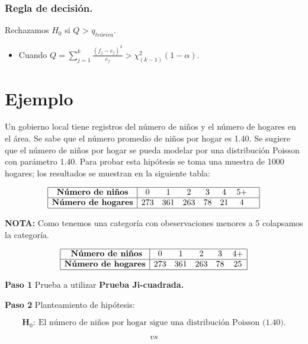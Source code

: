 \documentclass[
  a4paper,
  oneside,
  openany]{book}
\providecommand{\tightlist}{%
  \setlength{\itemsep}{0pt}\setlength{\parskip}{0pt}}
\begin{document}
\hypertarget{regla-de-decisiuxf3n.}{%
\subsubsection*{Regla de decisión.}\label{regla-de-decisiuxf3n.}}


Rechazamos \(H_0\) si \(Q\) \textgreater{} \(q_{teórica}.\)

\begin{itemize}
\tightlist
\item
  Cuando \(Q= \sum_{j=1}^{k}\frac{(f_{j}-e_{j})^2}{e_{j}} > \chi^2_{(k-1)}(1-\alpha).\)
\end{itemize}

\hypertarget{ejemplo-11}{%
\section{Ejemplo}\label{ejemplo-11}}

Un gobierno local tiene registros del número de niños y el número de hogares en el área. Se sabe que el número promedio de niños por hogar es 1.40. Se sugiere que el número de niños por hogar se pueda modelar por una distribución Poisson con parámetro 1.40.
Para probar esta hipótesis se toma una muestra de 1000 hogares; los resultados se muestran en la siguiente tabla:

\[
\begin{array}{|c |c c c c c c c|}
\hline
\textbf{Número de niños} &0 &1 &2& 3&4 &5+& \\
\hline
\textbf{Número de hogares} & 273& 361&263 &78 & 21 & 4& \\
\hline
\end{array}
\]

\textbf{NOTA:} Como tenemos una categoría con obeservaciones menores a 5 colapsamos la categoría.

\[
\begin{array}{|c |c c c c c|}
\hline
\textbf{  Número de niños} &0 &1 &2& 3&4+  \\
\hline
\textbf{Número de hogares} & 273& 361&263 &78 & 25  \\
\hline
\end{array}
\]

\textbf{Paso 1} Prueba a utilizar \textbf{Prueba Ji-cuadrada.}

\textbf{Paso 2} Planteamiento de hipótesis:

\[\textbf{H}_0: \ \mbox{El número de niños por hogar sigue una distribución Poisson (1.40).}\]

\[vs\]
\end{document}
